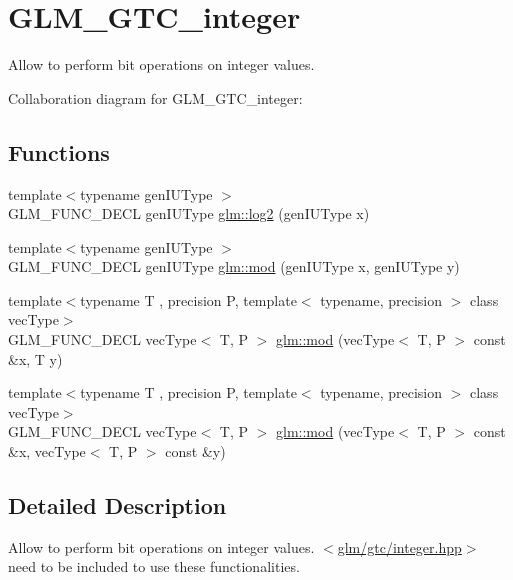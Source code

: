 \hypertarget{group__gtc__integer}{\section{G\-L\-M\-\_\-\-G\-T\-C\-\_\-integer}
\label{group__gtc__integer}
}


Allow to perform bit operations on integer values.  


Collaboration diagram for G\-L\-M\-\_\-\-G\-T\-C\-\_\-integer\-:
\subsection*{Functions}
\begin{DoxyCompactItemize}
\item 
{\footnotesize template$<$typename gen\-I\-U\-Type $>$ }\\G\-L\-M\-\_\-\-F\-U\-N\-C\-\_\-\-D\-E\-C\-L gen\-I\-U\-Type \hyperlink{group__gtc__integer_ga9bd682e74bfacb005c735305207ec417}{glm\-::log2} (gen\-I\-U\-Type x)
\item 
{\footnotesize template$<$typename gen\-I\-U\-Type $>$ }\\G\-L\-M\-\_\-\-F\-U\-N\-C\-\_\-\-D\-E\-C\-L gen\-I\-U\-Type \hyperlink{group__gtc__integer_ga75c6fd2a143fc44e5f7b871abad539e0}{glm\-::mod} (gen\-I\-U\-Type x, gen\-I\-U\-Type y)
\item 
{\footnotesize template$<$typename T , precision P, template$<$ typename, precision $>$ class vec\-Type$>$ }\\G\-L\-M\-\_\-\-F\-U\-N\-C\-\_\-\-D\-E\-C\-L vec\-Type$<$ T, P $>$ \hyperlink{group__gtc__integer_ga1d3f62c015315540cebf1f915b67dd9c}{glm\-::mod} (vec\-Type$<$ T, P $>$ const \&x, T y)
\item 
{\footnotesize template$<$typename T , precision P, template$<$ typename, precision $>$ class vec\-Type$>$ }\\G\-L\-M\-\_\-\-F\-U\-N\-C\-\_\-\-D\-E\-C\-L vec\-Type$<$ T, P $>$ \hyperlink{group__gtc__integer_ga689e2d9100af0bfc4d9954c96221095e}{glm\-::mod} (vec\-Type$<$ T, P $>$ const \&x, vec\-Type$<$ T, P $>$ const \&y)
\end{DoxyCompactItemize}


\subsection{Detailed Description}
Allow to perform bit operations on integer values. $<$\hyperlink{gtc_2integer_8hpp}{glm/gtc/integer.\-hpp}$>$ need to be included to use these functionalities. 


